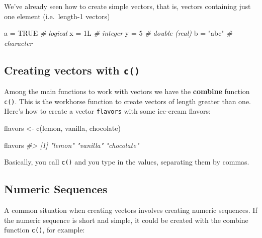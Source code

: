 \documentclass[
]{book}
\newenvironment{Shaded}{\begin{snugshade}}{\end{snugshade}}
\newcommand{\CommentTok}[1]{\textcolor[rgb]{0.56,0.35,0.01}{\textit{#1}}}
\newcommand{\ConstantTok}[1]{\textcolor[rgb]{0.00,0.00,0.00}{#1}}
\newcommand{\DecValTok}[1]{\textcolor[rgb]{0.00,0.00,0.81}{#1}}
\newcommand{\FunctionTok}[1]{\textcolor[rgb]{0.00,0.00,0.00}{#1}}
\newcommand{\NormalTok}[1]{#1}
\newcommand{\OtherTok}[1]{\textcolor[rgb]{0.56,0.35,0.01}{#1}}
\newcommand{\StringTok}[1]{\textcolor[rgb]{0.31,0.60,0.02}{#1}}
\begin{document}
We've already seen how to create simple vectors, that is, vectors containing
just one element (i.e.~length-1 vectors)

\begin{Shaded}
\begin{Highlighting}[]
\NormalTok{a }\OtherTok{=} \ConstantTok{TRUE}  \CommentTok{\# logical}
\NormalTok{x }\OtherTok{=}\NormalTok{ 1L    }\CommentTok{\# integer}
\NormalTok{y }\OtherTok{=} \DecValTok{5}     \CommentTok{\# double (real)}
\NormalTok{b }\OtherTok{=} \StringTok{"abc"} \CommentTok{\# character}
\end{Highlighting}
\end{Shaded}

\hypertarget{creating-vectors-with-c}{%
\subsection{\texorpdfstring{Creating vectors with \texttt{c()}}{Creating vectors with c()}}\label{creating-vectors-with-c}}

Among the main functions to work with vectors we have the \textbf{combine} function
\texttt{c()}. This is the workhorse function to create vectors of length greater
than one. Here's how to create a vector \texttt{flavors} with some ice-cream flavors:

\begin{Shaded}
\begin{Highlighting}[]
\NormalTok{flavors }\OtherTok{\textless{}{-}} \FunctionTok{c}\NormalTok{(}\StringTok{\textquotesingle{}lemon\textquotesingle{}}\NormalTok{, }\StringTok{\textquotesingle{}vanilla\textquotesingle{}}\NormalTok{, }\StringTok{\textquotesingle{}chocolate\textquotesingle{}}\NormalTok{)}

\NormalTok{flavors}
\CommentTok{\#\textgreater{} [1] "lemon"     "vanilla"   "chocolate"}
\end{Highlighting}
\end{Shaded}

Basically, you call \texttt{c()} and you type in the values, separating them by
commas.

\hypertarget{numeric-sequences}{%
\subsection{Numeric Sequences}\label{numeric-sequences}}

A common situation when creating vectors involves creating numeric sequences.
If the numeric sequence is short and simple, it could be created with the
combine function \texttt{c()}, for example:
\end{document}
